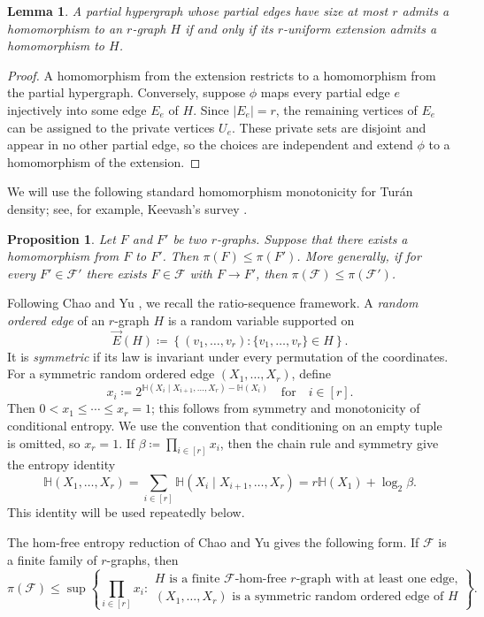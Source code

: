 \documentclass[10pt,a4paper]{article}
\theoremstyle{plain}
\newtheorem{lemma}[lemma]{Lemma}
\newtheorem{proposition}[proposition]{Proposition}
\theoremstyle{definition}
\theoremstyle{plain}
\newcommand{\calF}{\mathcal F}
\newcommand{\HH}{\mathbb H}
\newcommand{\dirE}{\vec E}
\begin{document}
\begin{lemma}\label{lem:extension-equivalence}
A partial hypergraph whose partial edges have size at most $r$ admits a homomorphism to an $r$-graph $H$ if and only if its $r$-uniform extension admits a homomorphism to $H$.
\end{lemma}

\begin{proof}
A homomorphism from the extension restricts to a homomorphism from the partial hypergraph.  Conversely, suppose $\phi$ maps every partial edge $e$ injectively into some edge $E_e$ of $H$.  Since $|E_e|=r$, the remaining vertices of $E_e$ can be assigned to the private vertices $U_e$.  These private sets are disjoint and appear in no other partial edge, so the choices are independent and extend $\phi$ to a homomorphism of the extension.
\end{proof}

We will use the following standard homomorphism monotonicity for Tur\'an density; see, for example, Keevash's survey \cite{Keevash11}.

\begin{proposition}\label{prop:hom-monotonicity}
    Let $F$ and $F'$ be two $r$-graphs. Suppose that there exists a homomorphism from $F$ to $F'$. Then $\pi(F)\le\pi(F')$. More generally, if for every $F'\in\calF'$ there exists $F\in\calF$ with $F\to F'$, then $\pi(\calF)\le\pi(\calF')$.
\end{proposition}


Following Chao and Yu \cite{CY24}, we recall the ratio-sequence framework.  A \emph{random ordered edge} of an $r$-graph $H$ is a random variable supported on
\[
        \dirE(H)\coloneqq\left\{(v_1,\ldots,v_r):\{v_1,\ldots,v_r\}\in H\right\}.
\]
It is \emph{symmetric} if its law is invariant under every permutation of the coordinates.  For a symmetric random ordered edge $(X_1,\ldots,X_r)$, define
\[
        x_i\coloneqq2^{\HH(X_i\mid X_{i+1},\ldots,X_r)-\HH(X_i)}\quad\text{for}\quad i\in[r].
\]
Then $0<x_1\le\cdots\le x_r=1$; this follows from symmetry and monotonicity of conditional entropy.  We use the convention that conditioning on an empty tuple is omitted, so $x_r=1$.  If $\beta\coloneqq\prod_{i\in [r]} x_i$, then the chain rule and symmetry give the entropy identity
\[
        \HH(X_1,\ldots,X_r)
        =\sum_{i\in [r]} \HH(X_i\mid X_{i+1},\ldots,X_r)
        =r\HH(X_1)+\log_2\beta.
\]
This identity will be used repeatedly below.

The hom-free entropy reduction of Chao and Yu \cite[Corollary~5.6]{CY24} gives the following form.  If $\calF$ is a finite family of $r$-graphs, then
\begin{equation}\label{eq:hom-free-entropy-reduction}
        \pi(\calF)\le
        \sup\left\{
        \prod_{i\in [r]} x_i:
        \begin{array}{l}
        H\text{ is a finite }\calF\text{-hom-free }r\text{-graph with at least one edge,}\\
        (X_1,\ldots,X_r)\text{ is a symmetric random ordered edge of }H
        \end{array}
        \right\}.
\end{equation}
\end{document}
